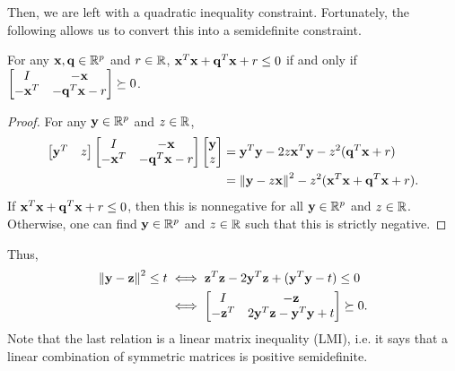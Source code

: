 \documentclass[11pt]{article}
\begin{document}
Then, we are left with a quadratic inequality constraint. Fortunately, the following allows us to convert this into a semidefinite constraint.
\begin{fact}
For any ${\bf x}, {\bf q} \in {\mathbb R}^p$ and $r \in {\mathbb R}$, ${\bf x}^T{\bf x} + {\bf q}^T{\bf x} + r \leq 0$ if and only if $\begin{bmatrix} I & -{\bf x} \\ -{\bf x}^T & -{\bf q}^T{\bf x} - r \end{bmatrix} \succeq 0$.
\end{fact}
\begin{proof}
For any ${\bf y} \in {\mathbb R}^p$ and $z \in {\mathbb R}$, 
\begin{align*}
\begin{bmatrix} {\bf y}^T & z \end{bmatrix} \begin{bmatrix} I & -{\bf x} \\ -{\bf x}^T & -{\bf q}^T{\bf x} - r \end{bmatrix} \begin{bmatrix} {\bf y} \\ z \end{bmatrix} &= {\bf y}^T{\bf y} -2z{\bf x}^T{\bf y} - z^2({\bf q}^T{\bf x}+r) \\
&= \left\lVert {\bf y} - z{\bf x} \right\rVert^2 - z^2({\bf x}^T{\bf x} + {\bf q}^T{\bf x} + r).
\end{align*}
If ${\bf x}^T{\bf x} + {\bf q}^T{\bf x} + r \leq 0$, then this is nonnegative for all ${\bf y} \in {\mathbb R}^p$ and $z \in {\mathbb R}$. Otherwise, one can find ${\bf y} \in {\mathbb R}^p$ and $z \in {\mathbb R}$ such that this is strictly negative.
\end{proof}

Thus,
\begin{align*}
\left\lVert {\bf y}-{\bf z} \right\rVert^2 \leq t &\iff {\bf z}^T{\bf z} - 2{\bf y}^T{\bf z} + ({\bf y}^T{\bf y} - t) \leq 0 \\
&\iff \begin{bmatrix} I & -{\bf z} \\ -{\bf z}^T & 2{\bf y}^T{\bf z} - {\bf y}^T{\bf y} + t \end{bmatrix} \succeq 0.
\end{align*}
Note that the last relation is a linear matrix inequality (LMI), i.e. it says that a linear combination of symmetric matrices is positive semidefinite. 
\end{document}
